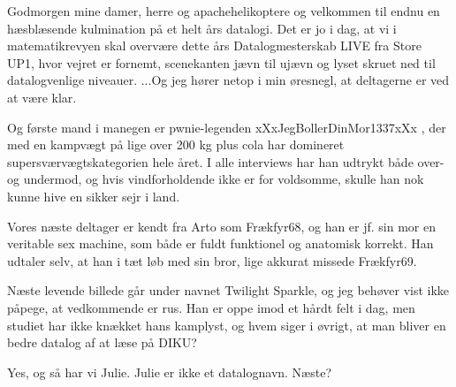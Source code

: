 \documentclass[a4paper,11pt]{article}
\begin{document}
\begin{sketch}







 Godmorgen mine damer, herre og apachehelikoptere og velkommen til endnu en hæsblæsende kulmination på et helt års datalogi. Det er jo i dag, at vi i matematikrevyen skal overvære dette års Datalogmesterskab LIVE fra Store UP1, hvor vejret er fornemt, scenekanten jævn til ujævn og lyset skruet ned til datalogvenlige niveauer.
...Og  jeg hører netop i min øresnegl, at deltagerne er ved at være klar.




 Og første mand i manegen er pwnie-legenden xXxJegBollerDinMor1337xXx , der med en kampvægt på lige over 200 kg plus cola har domineret supersværvægtskategorien hele året. I alle interviews har han udtrykt både over- og undermod, og hvis vindforholdende ikke er for voldsomme, skulle han nok kunne hive en sikker sejr i land.




 Vores næste deltager er kendt fra Arto som Frækfyr68, og han er jf. sin mor en veritable sex machine, som både er fuldt funktionel og anatomisk korrekt. Han udtaler selv, at han i tæt løb med sin bror, lige akkurat missede Frækfyr69.




 Næste levende billede går under navnet Twilight Sparkle, og jeg behøver vist ikke påpege, at vedkommende er rus. Han er oppe imod et hårdt felt i dag, men studiet har ikke knækket hans kamplyst, og hvem siger i øvrigt, at man bliver en bedre datalog af at læse på DIKU?




 Yes, og så har vi Julie. Julie er ikke et datalognavn. Næste?



\end{sketch}
\end{document}
